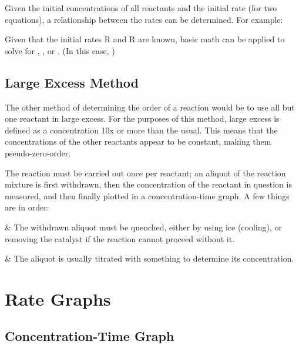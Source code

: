 			Given the initial concentrations of all reactants and the initial rate (for two equations), a relationship between the rates can be
			determined. For example:


			Given that the initial rates R and R are known, basic math can be applied to solve for , ,
			or . (In this case, )


		\subsection{Large Excess Method}

			The other method of determining the order of a reaction would be to use all but one reactant in large excess. For the purposes of this
			method, large excess is defined as a concentration 10x or more than the usual. This means that the concentrations of the other
			reactants appear to be constant, making them pseudo-zero-order.

			The reaction must be carried out once per reactant; an aliquot of the reaction mixture is first withdrawn, then the concentration of the
			reactant in question is measured, and then finally plotted in a concentration-time graph. A few things are in order:

			\begin{bulletlist}
				&	The withdrawn aliquot must be quenched, either by using ice (cooling), or removing the catalyst if the reaction cannot proceed
					without it.

				&	The aliquot is usually titrated with something to determine its concentration.
			\end{bulletlist}






	\pagebreak
	\section{Rate Graphs}

		\subsection{Concentration-Time Graph}

